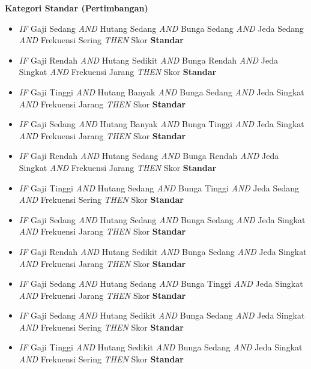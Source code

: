\documentclass[12pt,a4paper]{report}
\begin{document}
\vspace{4pt}
\noindent\textbf{Kategori Standar (Pertimbangan)}
\begin{itemize}
  \item[R05] \textit{IF} Gaji Sedang \textit{AND} Hutang Sedang \textit{AND} Bunga Sedang \textit{AND} Jeda Sedang \textit{AND} Frekuensi Sering \textit{THEN} Skor \textbf{Standar}
  \item[R06] \textit{IF} Gaji Rendah \textit{AND} Hutang Sedikit \textit{AND} Bunga Rendah \textit{AND} Jeda Singkat \textit{AND} Frekuensi Jarang \textit{THEN} Skor \textbf{Standar}
  \item[R07] \textit{IF} Gaji Tinggi \textit{AND} Hutang Banyak \textit{AND} Bunga Sedang \textit{AND} Jeda Singkat \textit{AND} Frekuensi Jarang \textit{THEN} Skor \textbf{Standar}
  \item[R08] \textit{IF} Gaji Sedang \textit{AND} Hutang Banyak \textit{AND} Bunga Tinggi \textit{AND} Jeda Singkat \textit{AND} Frekuensi Jarang \textit{THEN} Skor \textbf{Standar}
  \item[R09] \textit{IF} Gaji Rendah \textit{AND} Hutang Sedang \textit{AND} Bunga Rendah \textit{AND} Jeda Singkat \textit{AND} Frekuensi Jarang \textit{THEN} Skor \textbf{Standar}
  \item[R10] \textit{IF} Gaji Tinggi \textit{AND} Hutang Sedang \textit{AND} Bunga Tinggi \textit{AND} Jeda Sedang \textit{AND} Frekuensi Sering \textit{THEN} Skor \textbf{Standar}
  \item[R18] \textit{IF} Gaji Sedang \textit{AND} Hutang Sedang \textit{AND} Bunga Sedang \textit{AND} Jeda Singkat \textit{AND} Frekuensi Jarang \textit{THEN} Skor \textbf{Standar}
  \item[R19] \textit{IF} Gaji Rendah \textit{AND} Hutang Sedikit \textit{AND} Bunga Sedang \textit{AND} Jeda Singkat \textit{AND} Frekuensi Jarang \textit{THEN} Skor \textbf{Standar}
  \item[R20] \textit{IF} Gaji Sedang \textit{AND} Hutang Sedang \textit{AND} Bunga Tinggi \textit{AND} Jeda Singkat \textit{AND} Frekuensi Jarang \textit{THEN} Skor \textbf{Standar}
  \item[R33] \textit{IF} Gaji Sedang \textit{AND} Hutang Sedikit \textit{AND} Bunga Sedang \textit{AND} Jeda Singkat \textit{AND} Frekuensi Sering \textit{THEN} Skor \textbf{Standar}
  \item[R34] \textit{IF} Gaji Tinggi \textit{AND} Hutang Sedikit \textit{AND} Bunga Sedang \textit{AND} Jeda Singkat \textit{AND} Frekuensi Sering \textit{THEN} Skor \textbf{Standar}
\end{itemize}
\end{document}
